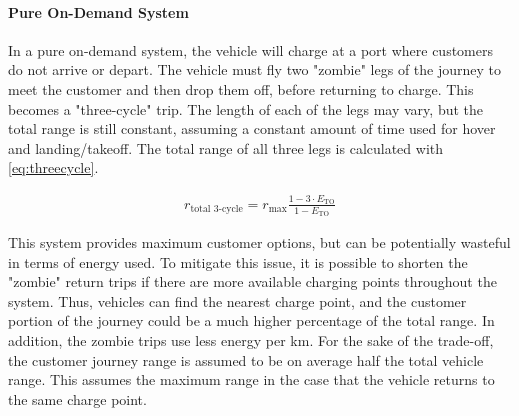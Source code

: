 \paragraph{Pure On-Demand System}
In a pure on-demand system, the vehicle will charge at a port where customers do not arrive or depart. The vehicle must fly two "zombie" legs of the journey to meet the customer and then drop them off, before returning to charge. This becomes a "three-cycle" trip.
The length of each of the legs may vary, but the total range is still constant, assuming a constant amount of time used for hover and landing/takeoff. The total range of all three legs is calculated with \autoref{eq:threecycle}.


\begin{equation}
\label{eq:threecycle}
\begin{split}
    r_\text{total 3-cycle} = r_\text{max}\frac{1-3\cdot E_\text{TO}}{1 - E_\text{TO}}
\end{split}
\end{equation}

This system provides maximum customer options, but can be potentially wasteful in terms of energy used. To mitigate this issue, it is possible to shorten the "zombie" return trips if there are more available charging points throughout the system. Thus, vehicles can find the nearest charge point, and the customer portion of the journey could be a much higher percentage of the total range. In addition, the zombie trips use less energy per km. For the sake of the trade-off, the customer journey range is assumed to be on average half the total vehicle range. This assumes the maximum range in the case that the vehicle returns to the same charge point.















